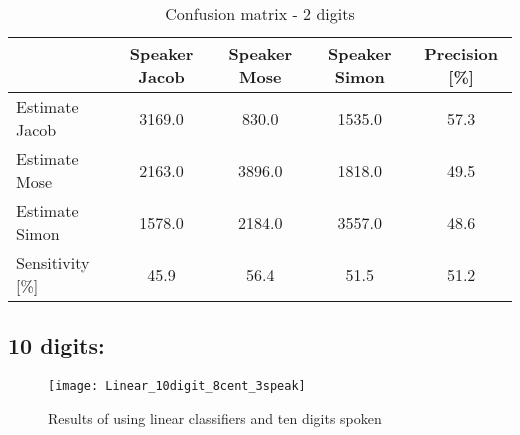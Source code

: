 \begin{table}[H]                                                    
\centering                                                          
\begin{tabular}{|l|c|c|c|c|}                                        
\hline                                                              
  & Speaker Jacob & Speaker Mose & Speaker Simon & Precision [\%] \\
\hline                                                              
Estimate Jacob & 3169.0 & 830.0 & 1535.0 & 57.3 \\                  
\hline                                                              
Estimate Mose & 2163.0 & 3896.0 & 1818.0 & 49.5 \\                  
\hline                                                              
Estimate Simon & 1578.0 & 2184.0 & 3557.0 & 48.6 \\                 
\hline                                                              
Sensitivity [\%] & 45.9 & 56.4 & 51.5 & 51.2 \\                     
\hline                                                              
\end{tabular}                                                       
\caption{Confusion matrix - 2 digits}                               
\label{table:Lin_conf_2}                                            
\end{table}                                


\subsection{10 digits:}

\begin{figure}[H]
\centering
\texttt{[image: Linear\_10digit\_8cent\_3speak]}
\caption{Results of using linear classifiers and ten digits spoken}
\label{fig:Lin_fig_10}
\end{figure}

